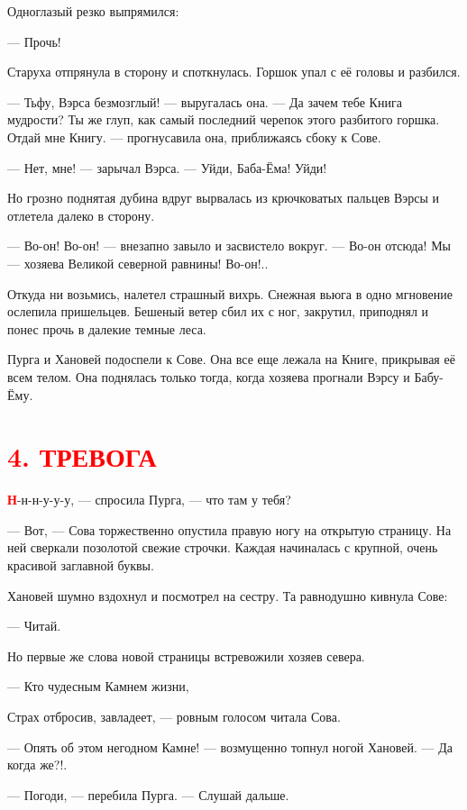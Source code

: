 \documentclass[oneside,final,14pt]{extreport}
\begin{document}
	Одноглазый резко выпрямился:
	
	— Прочь!
	
	Старуха отпрянула в сторону и споткнулась. Горшок упал с её головы и разбился.
	
	— Тьфу, Вэрса безмозглый! — выругалась она. — Да зачем тебе Книга мудрости? Ты же глуп, как самый последний черепок этого разбитого горшка. Отдай мне Книгу. — прогнусавила она, приближаясь сбоку к Сове.
	
	— Нет, мне! — зарычал Вэрса. — Уйди, Баба-Ёма! Уйди!
	
	Но грозно поднятая дубина вдруг вырвалась из крючковатых пальцев Вэрсы и отлетела далеко в сторону.
	
	— Во-он! Во-он! — внезапно завыло и засвистело вокруг. — Во-он отсюда! Мы — хозяева Великой северной равнины! Во-он!..
	
	Откуда ни возьмись, налетел страшный вихрь. Снежная вьюга в одно мгновение ослепила пришельцев. Бешеный ветер сбил их с ног, закрутил, приподнял и понес прочь в далекие темные леса.
	
	Пурга и Хановей подоспели к Сове. Она все еще лежала на Книге, прикрывая её всем телом. Она поднялась только тогда, когда хозяева прогнали Вэрсу и Бабу-Ёму.
	
		\section[4. Тревога]{\center \textcolor{red}{4. ТРЕВОГА}}
	
	\lettrine[findent=0pt]{\textbf{\textcolor{red}{Н}}}{}-н-н-у-у-у, — спросила Пурга, — что там у тебя?
	
	\qquad  	 — Вот, — Сова торжественно опустила правую ногу на открытую страницу. На ней сверкали позолотой свежие строчки. Каждая начиналась с крупной, очень красивой заглавной буквы.
	
	Хановей шумно вздохнул и посмотрел на сестру. Та равнодушно кивнула Сове:
	
	— Читай.
	
	Но первые же слова новой страницы встревожили хозяев севера.
	
	— Кто чудесным Камнем жизни,
	
	Страх отбросив, завладеет, — ровным голосом читала Сова.
	
	— Опять об этом негодном Камне! — возмущенно топнул ногой Хановей. — Да когда же?!.
	
	— Погоди, — перебила Пурга. — Слушай дальше.
	
\end{document}

